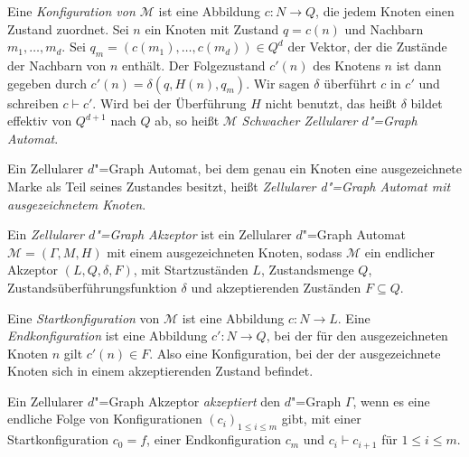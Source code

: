 \documentclass[11pt]{article}
\newcommand{\defWord}[1]{\emph{#1}}
\begin{document}
\begin{definition}[Konfiguration]
	Eine \defWord{Konfiguration von $\mathcal{M}$} ist eine Abbildung $c : N \rightarrow Q$, die jedem Knoten einen Zustand zuordnet.
	Sei $n$ ein Knoten mit Zustand $q = c\left(n\right)$ und Nachbarn $m_1, \dots, m_d$. 
	Sei $q_m = \left( c\left( m_1\right), \dots , c\left(m_d\right)\right) \in Q^d$ der Vektor, der die Zustände der Nachbarn von $n$ enthält. 
	Der Folgezustand $c'\left( n\right)$ des Knotens $n$ ist dann gegeben durch $c'\left(n\right) = \delta\left(q, H\left(n\right),q_m \right) $. 
	Wir sagen $\delta$ überführt $c$ in $c'$ und schreiben $c \vdash c'$.
	Wird bei der Überführung $H$ nicht benutzt, das heißt $\delta$ bildet effektiv von $Q^{d+1}$ nach $Q$ ab, so heißt $\mathcal{M}$ \defWord{Schwacher Zellularer $d$"=Graph Automat}.
\end{definition}

\begin{definition}[Akzeptanz]
	Ein Zellularer $d$"=Graph Automat, bei dem genau ein Knoten eine ausgezeichnete Marke als Teil seines Zustandes  besitzt, heißt \defWord{Zellularer d"=Graph Automat mit ausgezeichnetem Knoten}.
	
	Ein \defWord{Zellularer $d$"=Graph Akzeptor} ist ein Zellularer $d$"=Graph Automat $\mathcal{M} = \left(\Gamma, M, H \right)$ mit einem ausgezeichneten Knoten, sodass $\mathcal{M}$ ein endlicher Akzeptor $\left(L, Q, \delta, F\right)$, mit Startzuständen $L$, Zustandsmenge $Q$, Zustandsüberführungsfunktion $\delta$ und akzeptierenden Zuständen $F \subseteq Q$.
	
	Eine \defWord{Startkonfiguration} von $\mathcal{M}$ ist eine Abbildung $c : N \rightarrow L$. 
	Eine \defWord{Endkonfiguration} ist eine Abbildung $c' : N \rightarrow Q$, bei der für den ausgezeichneten Knoten $\hat{n}$ gilt $c'\left(n\right) \in F$. 
	Also eine Konfiguration, bei der der ausgezeichnete Knoten sich in einem akzeptierenden Zustand befindet.
	
	Ein Zellularer $d$"=Graph Akzeptor \defWord{akzeptiert} den $d$"=Graph $\Gamma$, wenn es eine endliche Folge von Konfigurationen $\left(c_i\right)_{1 \le i \le m}$ gibt, mit einer Startkonfiguration $c_0 = f$, einer Endkonfiguration $c_m$ und $c_i \vdash c_{i+1}$ für $1 \le i \le m$.
\end{definition}
\end{document}
